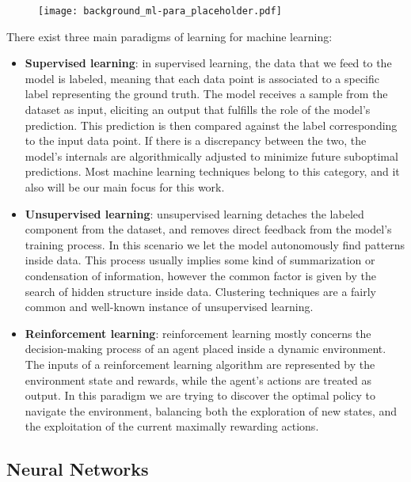 \begin{figure}[H]
    \centering
    \texttt{[image: background\_ml-para\_placeholder.pdf]}
    \caption{}
    \label{fig:background_ml-paradigm}
\end{figure}

There exist three main paradigms of learning for machine learning:
\begin{itemize}
    \item \textbf{Supervised learning}: in supervised learning, the data that we feed to the model is labeled, meaning that each data point is associated to a specific label representing the ground truth.
The model receives a sample from the dataset as input, eliciting an output that fulfills the role of the model's prediction.
This prediction is then compared against the label corresponding to the input data point.
If there is a discrepancy between the two, the model's internals are algorithmically adjusted to minimize future suboptimal predictions.
Most machine learning techniques belong to this category, and it also will be our main focus for this work.
    \item \textbf{Unsupervised learning}: unsupervised learning detaches the labeled component from the dataset, and removes direct feedback from the model's training process.
In this scenario we let the model autonomously find patterns inside data.
This process usually implies some kind of summarization or condensation of information, however the common factor is given by the search of hidden structure inside data.
Clustering techniques are a fairly common and well-known instance of unsupervised learning. 
    \item \textbf{Reinforcement learning}: reinforcement learning mostly concerns the decision-making process of an agent placed inside a dynamic environment.
The inputs of a reinforcement learning algorithm are represented by the environment state and rewards, while the agent's actions are treated as output.
In this paradigm we are trying to discover the optimal policy to navigate the environment, balancing both the exploration of new states, and the exploitation of the current maximally rewarding actions.
\end{itemize}

\subsection{Neural Networks}


